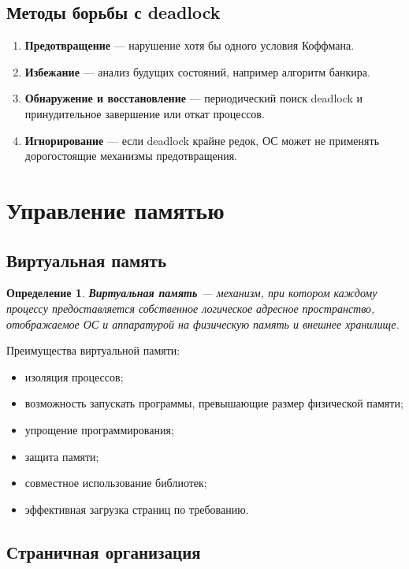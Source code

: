 \documentclass[12pt,a4paper]{article}
\newtheorem{definition}{Определение}
\begin{document}
\subsection{Методы борьбы с deadlock}

\begin{enumerate}
    \item \textbf{Предотвращение} --- нарушение хотя бы одного условия Коффмана.
    \item \textbf{Избежание} --- анализ будущих состояний, например алгоритм банкира.
    \item \textbf{Обнаружение и восстановление} --- периодический поиск deadlock и принудительное завершение или откат процессов.
    \item \textbf{Игнорирование} --- если deadlock крайне редок, ОС может не применять дорогостоящие механизмы предотвращения.
\end{enumerate}

\section{Управление памятью}

\subsection{Виртуальная память}

\begin{definition}
\textbf{Виртуальная память} --- механизм, при котором каждому процессу предоставляется собственное логическое адресное пространство, отображаемое ОС и аппаратурой на физическую память и внешнее хранилище.
\end{definition}

Преимущества виртуальной памяти:

\begin{itemize}
    \item изоляция процессов;
    \item возможность запускать программы, превышающие размер физической памяти;
    \item упрощение программирования;
    \item защита памяти;
    \item совместное использование библиотек;
    \item эффективная загрузка страниц по требованию.
\end{itemize}

\subsection{Страничная организация}
\end{document}
